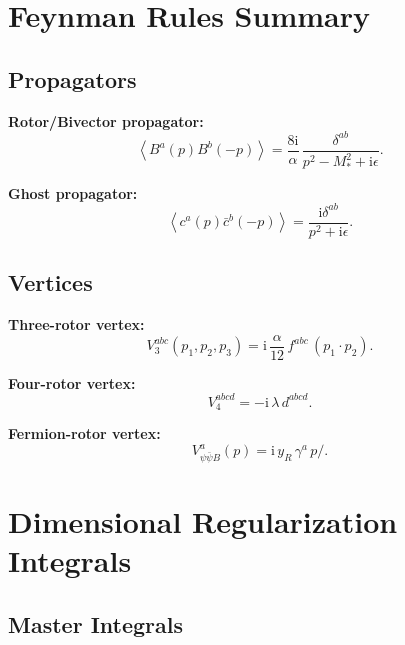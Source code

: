 \documentclass[11pt,a4paper]{article}
\numberwithin{equation}{section}
\theoremstyle{plain}
\theoremstyle{definition}
\theoremstyle{remark}
\newcommand{\ii}{\mathrm{i}}
\newcommand{\avg}[1]{\left\langle #1 \right\rangle}
\begin{document}
\appendix

\section{Feynman Rules Summary}\label{app:feynman}

\subsection{Propagators}

\textbf{Rotor/Bivector propagator:}
\begin{equation}
\avg{B^a(p)B^b(-p)} = \frac{8\ii}{\alpha}\,\frac{\delta^{ab}}{p^2 - M_*^2 + \ii\epsilon}.
\label{eq:prop-summary}
\end{equation}

\textbf{Ghost propagator:}
\begin{equation}
\avg{c^a(p)\bar c^b(-p)} = \frac{\ii\delta^{ab}}{p^2+\ii\epsilon}.
\label{eq:ghost-prop-summary}
\end{equation}

\subsection{Vertices}

\textbf{Three-rotor vertex:}
\begin{equation}
V_3^{abc}(p_1,p_2,p_3) = \ii\,\frac{\alpha}{12}\,f^{abc}\,(p_1\cdot p_2).
\label{eq:V3-summary}
\end{equation}

\textbf{Four-rotor vertex:}
\begin{equation}
V_4^{abcd} = -\ii\,\lambda\,d^{abcd}.
\label{eq:V4-summary}
\end{equation}

\textbf{Fermion-rotor vertex:}
\begin{equation}
V_{\psi\bar\psi B}^a(p) = \ii\,y_R\,\gamma^a\,p\!\!\!/.
\label{eq:V-fermion-summary}
\end{equation}

\section{Dimensional Regularization Integrals}\label{app:integrals}

\subsection{Master Integrals}
\end{document}
